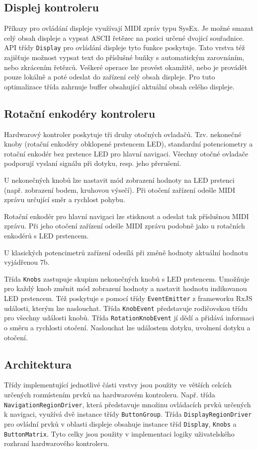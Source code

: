 \documentclass[thesis=M,czech]{FITthesis}[2019/03/06]
\begin{document}
		\subsection{Displej kontroleru}
		Příkazy pro ovládání displeje využívají MIDI zpráv typu SysEx. Je možné smazat celý obsah displeje a 
		vypsat ASCII řetězec na pozici určené dvojicí souřadnice. API třídy \texttt{Display} pro ovládání displeje tyto funkce poskytuje.
		Tato vrstva též zajišťuje možnost vypsat text do příslušné buňky s automatickým zarovnáním, nebo zkrácením řetězců.
		Veškeré operace lze provést okamžitě, nebo je provádět pouze lokálně a poté odeslat do zařízení celý obsah displeje.
		Pro tuto optimalizace třída zahrnuje buffer obsahující aktuální obsah celého displeje.

		\subsection{Rotační enkodéry kontroleru}
		Hardwarový kontroler poskytuje tři druhy otočných ovladačů. Tzv. nekonečné knoby (rotační enkodéry obklopené
		prstencem LED), standardní potenciometry a rotační enkodér bez prstence LED pro hlavní navigaci.
		Všechny otočné ovladače podporují vyslaní signálu při dotyku, resp. jeho přerušení. 
		
		U nekonečných knobů lze nastavit mód zobrazení hodnoty na LED prstenci (např. zobrazení bodem, kruhovou výsečí).
		Při otočení zařízení odešle MIDI zprávu určující směr a rychlost pohybu.
		
		Rotační enkodér pro	hlavní navigaci lze stisknout a odeslat tak příslušnou MIDI zprávu. Při jeho otočení
		zařízení odešle MIDI zprávu podobně jako u rotačních enkodérů s LED prstencem.
		
		U klasických potencimetrů zařízení odesílá při změně hodnoty aktuální hodnotu vyjádřenou 7b.
		
		Třída \texttt{Knobs} zastupuje skupinu nekonečných knobů s LED prstencem. Umožňuje pro každý knob změnit mód zobrazení hodnoty a
		nastavit hodnotu indikovanou LED prstencem. Též poskytuje s pomocí třídy \texttt{EventEmitter} z frameworku RxJS události, kterým lze naslouchat.
		Třída \texttt{KnobEvent} představuje rodičovskou třídu pro všechny události knobů. Třída \texttt{Rotation\-Knob\-Event} jí dědí a přidává informaci
		o směru a rychlosti otočení. Naslouchat lze událostem dotyku, uvolnení dotyku a otočení.
		
		\subsection{Architektura}
		Třídy implementující jednotlivé části vrstvy jsou použity ve větších celcích určených rozmístením prvků na hardwarovém kontroleru.
		Např. třída \linebreak	\texttt{Navigation\-Region\-Driver}, která představuje množinu ovládacích prvků určených k navigaci, využívá dvě instance třídy \texttt{ButtonGroup}.
		Třída \texttt{DisplayRegionDriver} pro ovládní prvků v oblasti displeje obsahuje instance tříd \texttt{Display}, \texttt{Knobs} a \texttt{ButtonMatrix}.
		Tyto celky jsou použity v implementaci logiky uživatelského rozhraní hardwarového kontroleru.
		
\end{document}
